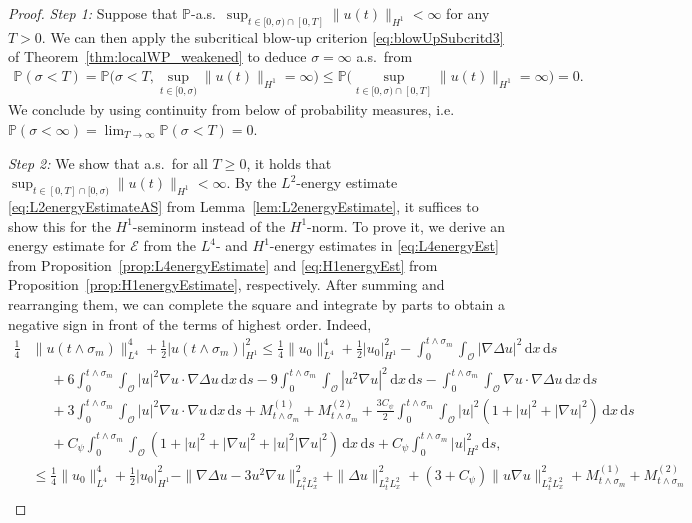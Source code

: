 \documentclass[reqno]{amsart}
\renewcommand{\P}{\mathbb{P}}
\newcommand{\sO}{\mathscr{O}}
\newcommand{\1}{\mathbf{1}}
\newcommand{\grad}{\nabla}
\newcommand{\ds}{\,\mathrm{d}s}
\newcommand{\dx}{\,\mathrm{d}x}
\newcommand{\inttm}{\int_0^{t\wedge\sigma_m}}
\newcommand{\intsO}{\int_{\sO}}
\begin{document}
\begin{proof}
    \textit{Step 1:} Suppose that $\P$-a.s.\ $\sup_{t\in[0,\sigma)\cap[0,T]} \|u(t)\|_{H^1}<\infty$ for any $T>0$. We can then apply the subcritical blow-up criterion \eqref{eq:blowUpSubcritd3} of Theorem~\ref{thm:localWP_weakened} to deduce $\sigma=\infty$ a.s.\ from
    \begin{align*}
	  \P(\sigma<T) = \P\Big(\sigma<T, \sup_{t\in [0,\sigma)} \|u(t)\|_{H^1}=\infty\Big)
	   \le \P\Big(\sup_{t\in [0,\sigma)\cap[0,T]} \|u(t)\|_{H^1}=\infty\Big)=0.
    \end{align*}
    We conclude by using continuity from below of probability measures, i.e.\  $\P(\sigma<\infty) = \lim_{T\to\infty} \P(\sigma < T) = 0$.
  
    \textit{Step 2:} We show that a.s.\ for all $T\ge 0$, it holds that $\sup_{t\in[0,T]\cap[0,\sigma)}  \|u(t)\|_{H^1}<\infty$. By the $L^2$-energy estimate \eqref{eq:L2energyEstimateAS} from Lemma~\ref{lem:L2energyEstimate}, it suffices to show this for the $H^1$-seminorm instead of the $H^1$-norm. To prove it, we derive an energy estimate for $\mathcal{E}$ from the $L^4$- and $H^1$-energy estimates in \eqref{eq:L4energyEst} from Proposition~\ref{prop:L4energyEstimate} and \eqref{eq:H1energyEst} from Proposition~\ref{prop:H1energyEstimate}, respectively. After summing and rearranging them, we can complete the square and integrate 
    by parts to obtain a negative sign in front of the terms of highest order. Indeed,
    \begin{align*}
        \frac{1}{4}&\|u(t\land \sigma_m)\|_{L^4}^4 + \frac{1}{2}|u(t \land \sigma_m)|^2_{H^1} \le \frac{1}{4}\|u_0\|_{L^4}^4 + \frac{1}{2}|u_0|^2_{H^1} - \inttm \intsO |\grad \Delta u|^2 \dx \ds\\
        &\phantom{\le }+ 6 \inttm\intsO |u|^2 \grad u \cdot \grad \Delta u \dx\ds - 9 \inttm\intsO |u^2 \grad u|^2\dx\ds- \inttm \intsO \grad u \cdot \grad \Delta u \dx \ds\\
         &\phantom{\le }+ 3 \inttm\intsO |u|^2 \grad u \cdot \grad u \dx\ds + M^{(1)}_{t\land \sigma_m} + M^{(2)}_{t\land\sigma_m}+ \frac{3C_\psi}{2} \inttm\intsO |u|^2 (1+|u|^2 + |\grad u|^2)  \dx \ds\\
         &\phantom{\le } +  C_\psi\inttm  \intsO  (1+|u|^2+|\grad u|^2 + |u|^2|\grad u|^2) \dx \ds + C_\psi \inttm  |u|_{H^2}^2 \ds, \\
     &\le\frac{1}{4}\|u_0\|_{L^4}^4 + \frac{1}{2}|u_0|^2_{H^1} - \|\grad \Delta u-3u^2 \grad u\|_{L_t^2L_x^2}^2+ \|\Delta u\|_{L_t^2L_x^2}^2+ (3+C_\psi)\|u\grad u\|_{L_t^2L_x^2}^2 + M^{(1)}_{t\land \sigma_m} + M^{(2)}_{t\land\sigma_m}\\

\end{align*}
\end{proof}
\end{document}

